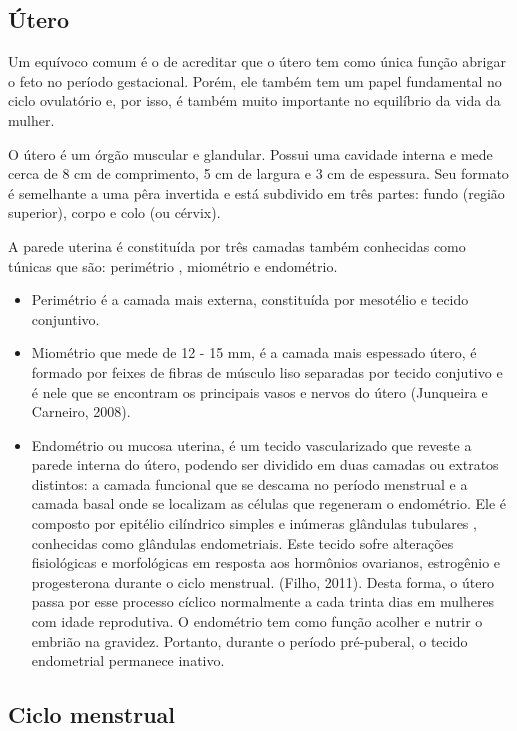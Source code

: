 \documentclass[12pt]{article} %
\begin{document}
\subsection{Útero}

Um equívoco comum é o de acreditar que o útero tem como única função
abrigar o feto no período gestacional. Porém, ele também tem um papel
fundamental no ciclo ovulatório e, por isso, é também muito importante
no equilíbrio da vida da mulher.

O útero é um órgão muscular e glandular. Possui uma cavidade interna e
mede cerca de 8 cm de comprimento, 5 cm de largura e 3 cm de
espessura. Seu formato é semelhante a uma pêra invertida e está
subdivido em três partes: fundo (região superior), corpo e colo (ou cérvix). %

A parede uterina é constituída por três camadas também conhecidas como túnicas que são: perimétrio , miométrio e endométrio.

\begin{itemize}
\item Perimétrio é a camada mais externa,
constituída por mesotélio e tecido conjuntivo.

\item Miométrio que mede de 12 - 15 mm, é a camada mais espessado útero, é formado por feixes de fibras de músculo liso
separadas por tecido conjutivo e é nele que se encontram os principais
vasos e nervos do útero (Junqueira e Carneiro, 2008). 

\item Endométrio ou mucosa uterina, é um tecido vascularizado que
reveste a parede interna do útero, podendo ser dividido em duas camadas ou extratos distintos: a camada funcional que se descama no período menstrual e a camada basal onde se localizam as células que regeneram o endométrio. Ele é composto por epitélio cilíndrico simples e inúmeras glândulas tubulares , conhecidas como glândulas endometriais. Este tecido sofre alterações fisiológicas e morfológicas em resposta aos hormônios ovarianos,
estrogênio e progesterona durante o ciclo menstrual. (Filho, 2011).  Desta forma, o útero passa por esse processo
cíclico normalmente a cada trinta dias em mulheres com idade
reprodutiva.  O endométrio tem como função acolher e nutrir o
embrião na gravidez. Portanto, durante o período pré-puberal, o
tecido endometrial permanece inativo.
\end{itemize}


\subsection{Ciclo menstrual}
\end{document}
